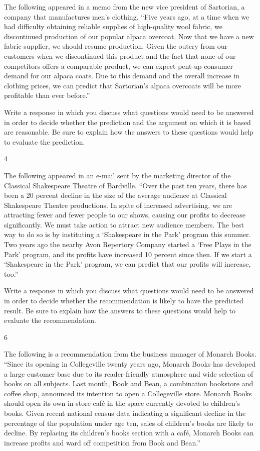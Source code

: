\documentclass[]{article}
\begin{document}
The following appeared in a memo from the new vice president of
Sartorian, a company that manufactures men's clothing. ``Five years ago,
at a time when we had difficulty obtaining reliable supplies of
high-quality wool fabric, we discontinued production of our popular
alpaca overcoat. Now that we have a new fabric supplier, we should
resume production. Given the outcry from our customers when we
discontinued this product and the fact that none of our competitors
offers a comparable product, we can expect pent-up consumer demand for
our alpaca coats. Due to this demand and the overall increase in
clothing prices, we can predict that Sartorian's alpaca overcoats will
be more profitable than ever before.''

Write a response in which you discuss what questions would need to be
answered in order to decide whether the prediction and the argument on
which it is based are reasonable. Be sure to explain how the answers to
these questions would help to evaluate the prediction.

4

The following appeared in an e-mail sent by the marketing director of
the Classical Shakespeare Theatre of Bardville. ``Over the past ten
years, there has been a 20 percent decline in the size of the average
audience at Classical Shakespeare Theatre productions. In spite of
increased advertising, we are attracting fewer and fewer people to our
shows, causing our profits to decrease significantly. We must take
action to attract new audience members. The best way to do so is by
instituting a `Shakespeare in the Park' program this summer. Two years
ago the nearby Avon Repertory Company started a `Free Plays in the Park'
program, and its profits have increased 10 percent since then. If we
start a `Shakespeare in the Park' program, we can predict that our
profits will increase, too.''

Write a response in which you discuss what questions would need to be
answered in order to decide whether the recommendation is likely to have
the predicted result. Be sure to explain how the answers to these
questions would help to evaluate the recommendation.

6

The following is a recommendation from the business manager of Monarch
Books. ``Since its opening in Collegeville twenty years ago, Monarch
Books has developed a large customer base due to its reader-friendly
atmosphere and wide selection of books on all subjects. Last month, Book
and Bean, a combination bookstore and coffee shop, announced its
intention to open a Collegeville store. Monarch Books should open its
own in-store café in the space currently devoted to children's books.
Given recent national census data indicating a significant decline in
the percentage of the population under age ten, sales of children's
books are likely to decline. By replacing its children's books section
with a café, Monarch Books can increase profits and ward off competition
from Book and Bean.''
\end{document}
